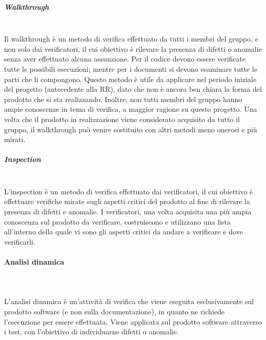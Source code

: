 \subparagraph*{Walkthrough} \mbox{}\\
Il walkthrough è un metodo di verifica effettuato da tutti i membri del gruppo, e non solo dai verificatori, il cui obiettivo è rilevare la presenza di difetti o anomalie senza aver effettuato alcuna assunzione.
Per il codice devono essere verificate tutte le possibili esecuzioni; mentre per i documenti si devono esaminare tutte le parti che li compongono.
Questo metodo è utile da applicare nel periodo iniziale del progetto (antecedente alla RR), dato che non è ancora ben chiara la forma del prodotto che si sta realizzando.
Inoltre, non tutti membri del gruppo hanno ampie conoscenze in tema di verifica, a maggior ragione su questo progetto. Una volta che il prodotto in realizzazione viene considerato acquisito da tutto il gruppo, il walkthrough può venire sostituito con altri metodi meno onerosi e più mirati.
\subparagraph*{Inspection} \mbox{}\\
L'inspection è un metodo di verifica effettuato dai verificatori, il cui obiettivo è effettuare verifiche mirate sugli aspetti critici del prodotto al fine di rilevare la presenza di difetti e anomalie.
I verificatori, una volta acquisita una più ampia conoscenza sul prodotto da verificare, costruiscono e utilizzano una lista all’interno della quale vi sono gli aspetti critici da andare a verificare e dove verificarli.

\paragraph{Analisi dinamica} \mbox{}\\ \\
L'analisi dinamica è un'attività di verifica che viene eseguita esclusivamente sul prodotto software (e non sulla documentazione), in quanto ne richiede l'esecuzione per essere effettuata.
Viene applicata sul prodotto software attraverso i test, con l’obiettivo di individuarne difetti o anomalie.

